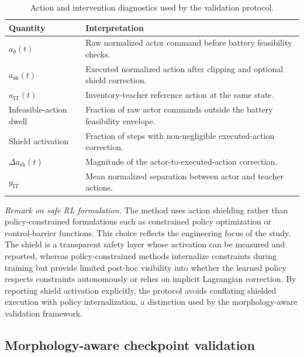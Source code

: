 \begin{table}[!t]
\centering
\footnotesize
\setlength{\tabcolsep}{3.5pt}
\renewcommand{\arraystretch}{1.08}
\caption{Action and intervention diagnostics used by the validation protocol.}
\label{tab:action_diagnostic_definitions}
\begin{tabularx}{\columnwidth}{lX}
\toprule
Quantity & Interpretation \\
\midrule
$a_{\theta}(t)$ & Raw normalized actor command before battery feasibility checks. \\
$a_{\mathrm{sh}}(t)$ & Executed normalized action after clipping and optional shield correction. \\
$a_{\mathrm{IT}}(t)$ & Inventory-teacher reference action at the same state. \\
Infeasible-action dwell & Fraction of raw actor commands outside the battery feasibility envelope. \\
Shield activation & Fraction of steps with non-negligible executed-action correction. \\
$\Delta a_{\mathrm{sh}}(t)$ & Magnitude of the actor-to-executed-action correction. \\
$g_{\mathrm{IT}}$ & Mean normalized separation between actor and teacher actions. \\
\bottomrule
\end{tabularx}
\end{table}

\emph{Remark on safe RL formulation.} The method uses action shielding rather than policy-constrained formulations such as constrained policy optimization \cite{achiam2017cpo} or control-barrier functions. This choice reflects the engineering focus of the study. The shield is a transparent safety layer whose activation can be measured and reported, whereas policy-constrained methods internalize constraints during training but provide limited post-hoc visibility into whether the learned policy respects constraints autonomously or relies on implicit Lagrangian correction. By reporting shield activation explicitly, the protocol avoids conflating shielded execution with policy internalization, a distinction used by the morphology-aware validation framework.

\subsection{Morphology-aware checkpoint validation}

